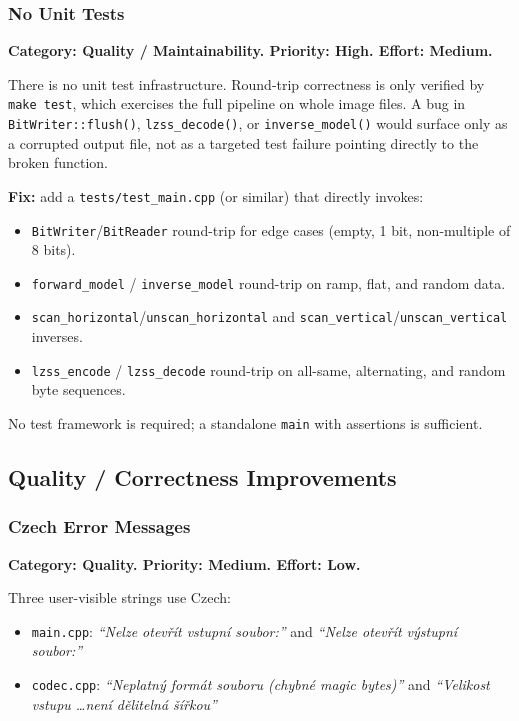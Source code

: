 \subsubsection{No Unit Tests}

\textbf{Category: Quality / Maintainability. Priority: High. Effort: Medium.}

There is no unit test infrastructure.
Round-trip correctness is only verified by \texttt{make test}, which exercises the
full pipeline on whole image files.
A bug in \texttt{BitWriter::flush()}, \texttt{lzss\_decode()}, or
\texttt{inverse\_model()} would surface only as a corrupted output file,
not as a targeted test failure pointing directly to the broken function.

\textbf{Fix:} add a \texttt{tests/test\_main.cpp} (or similar) that directly invokes:
\begin{itemize}
  \item \texttt{BitWriter}/\texttt{BitReader} round-trip for edge cases
        (empty, 1 bit, non-multiple of 8 bits).
  \item \texttt{forward\_model} / \texttt{inverse\_model} round-trip on ramp, flat, and random data.
  \item \texttt{scan\_horizontal}/\texttt{unscan\_horizontal} and
        \texttt{scan\_vertical}/\texttt{unscan\_vertical} inverses.
  \item \texttt{lzss\_encode} / \texttt{lzss\_decode} round-trip on all-same, alternating,
        and random byte sequences.
\end{itemize}
No test framework is required; a standalone \texttt{main} with assertions is sufficient.

\subsection{Quality / Correctness Improvements}

\subsubsection{Czech Error Messages}

\textbf{Category: Quality. Priority: Medium. Effort: Low.}

Three user-visible strings use Czech:
\begin{itemize}
  \item \texttt{main.cpp}: \textit{``Nelze otevřít vstupní soubor:''} and
        \textit{``Nelze otevřít výstupní soubor:''}
  \item \texttt{codec.cpp}: \textit{``Neplatný formát souboru (chybné magic bytes)''} and
        \textit{``Velikost vstupu \ldots není dělitelná šířkou''}
\end{itemize}

